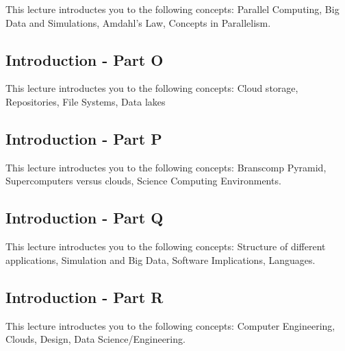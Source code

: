 This lecture introductes you to the following concepts: Parallel Computing, 
Big Data and Simulations, Amdahl's Law, Concepts in Parallelism. 

\subsection{Introduction - Part O}\label{s:cloud-fundamentals-o}

This lecture introductes you to the following concepts: Cloud storage, 
Repositories, File Systems, Data lakes

\subsection{Introduction - Part P}\label{s:cloud-fundamentals-p}

This lecture introductes you to the following concepts: Branscomp Pyramid, 
Supercomputers versus clouds, Science Computing Environments. 

\subsection{Introduction - Part Q}\label{s:cloud-fundamentals-q}

This lecture introductes you to the following concepts: Structure of different
applications, Simulation and Big Data, Software Implications, Languages. 

\subsection{Introduction - Part R}\label{s:cloud-fundamentals-r}

This lecture introductes you to the following concepts: Computer Engineering,
Clouds, Design, Data Science/Engineering. 

